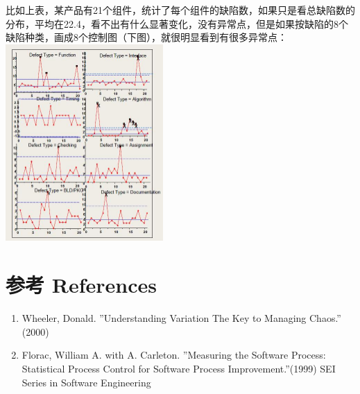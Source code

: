 比如上表，某产品有21个组件，统计了每个组件的缺陷数，如果只是看总缺陷数的分布，平均在22.4，看不出有什么显著变化，没有异常点，但是如果按缺陷的8个缺陷种类，画成8个控制图（下图），就很明显看到有很多异常点：\\

\includegraphics[width=6cm]{DAD_p67.jpg}

\hypertarget{ux9644ux4ef6}{%
\section{参考 References}\label{ux9644ux4ef6}}

\begin{enumerate}
\tightlist
\item
  Wheeler, Donald. ''Understanding Variation The Key to Managing Chaos.'' (2000) 
\item
  Florac, William A. with A. Carleton. ''Measuring the Software Process: Statistical Process Control for Software Process Improvement.''(1999) SEI Series in Software Engineering 
\end{enumerate}




